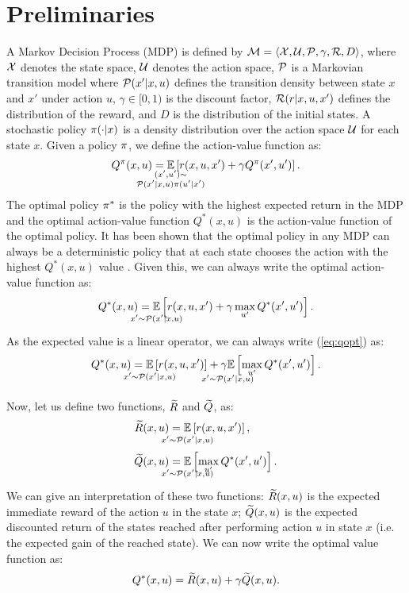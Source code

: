 \documentclass[conference]{IEEEtran}
\begin{document}
\section{Preliminaries}
A Markov Decision Process (MDP) is defined by $\mathcal{M} = \langle \mathcal X,\mathcal U,\mathcal{P},\gamma,\mathcal{R}, D\rangle$, where $\mathcal X$ denotes the state space, $\mathcal U$ denotes the action space, $\mathcal{P}$ is a Markovian transition model where $\mathcal{P}(x'|x,u)$ defines the transition density between state $x$ and $x'$ under action $u$, $\gamma\in[0,1)$ is the discount factor, $\mathcal{R}(r|x, u, x')$ defines the distribution of the reward, and $D$ is the distribution of the initial states.
A stochastic policy $\pi(\cdot|x)$ is a density distribution over the action space $\mathcal U$ for each state $x$.
Given a policy $\pi$, we define the action-value function as:
\begin{align}
 Q^\pol(x,u)=\underset{\strut\mathclap{\substack{(x', u')\sim \\ \Pmodel(x'|x,u)\pol(u'|x')}}}{\mathbb{E}}\left[ r(x,u,x')+\gamma Q^\pol(x',u')\right].
 \label{eq:qpol}
\end{align}
The optimal policy $\pi^*$ is the policy with the highest expected return in the MDP and the optimal action-value function $Q^*(x, u)$ is the action-value function of the optimal policy.
It has been shown that the optimal policy in any MDP can always be a deterministic policy that at each state chooses the action with the highest $Q^*(x, u)$ value \cite{watkins1992q}.
Given this, we can always write the optimal action-value function as:
\begin{align}
 Q^*(x,u)=\underset{\strut\mathclap{x'\sim \Pmodel(x'|x,u)}}{\mathbb{E}}\left[ r(x,u,x')+\gamma\max_{u'} Q^*(x',u')\right].
 \label{eq:qopt}
\end{align}
As the expected value is a linear operator, we can always write (\ref{eq:qopt}) as:
\begin{align}
 Q^*(x,u)=\underset{\strut\mathclap{x'\sim \Pmodel(x'|x,u)}}{\mathbb{E}}\left[ r(x,u,x')\right]+\underset{\strut\mathclap{x'\sim \Pmodel(x'|x,u)}}{\gamma\mathbb{E}}\left[ \max_{u'} Q^*(x',u')\right].
 \label{eq:qdec}
\end{align}

Now, let us define two functions, $\widetilde{R}$ and $\widetilde{Q}$, as:
\begin{align}
 \Rtilde(x,u)&=\underset{\strut\mathclap{x'\sim \Pmodel(x'|x,u)}}{\mathbb{E}}\left[ r(x,u,x')\right], \nonumber\ \\
 \Qtilde(x,u)&=\underset{\strut\mathclap{x'\sim \Pmodel(x'|x,u)}}{\mathbb{E}}\left[\max_{u'} Q^*(x',u')\right].
 \label{eq:rqtilde}
\end{align}
We can give an interpretation of these two functions: $\widetilde{R}(x,u)$ is the expected immediate reward of the action $u$ in the state $x$; $\widetilde{Q}(x,u)$ is the expected discounted return of the states reached after performing action $u$ in state $x$ (i.e. the expected gain of the reached state).
We can now write the optimal value function as:
\begin{align}
 Q^*(x,u)=\Rtilde(x,u)+\gamma\Qtilde(x,u).
 \label{eq:qdecrqtilde}
\end{align}
\end{document}
